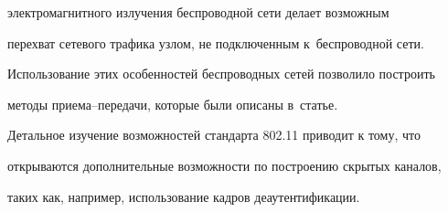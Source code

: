 электромагнитного излучения беспроводной сети делает возможным


перехват сетевого трафика узлом, не подключенным к~беспроводной сети.


Использование этих особенностей беспроводных сетей позволило построить


методы при\-е\-ма--пе\-ре\-да\-чи, которые были описаны \mbox{в~статье}.


{





}





  Детальное изучение возможностей стандарта 802.11 приводит к тому, что


открываются дополнительные возможности по построению скрытых каналов,


таких как, например, использование кадров деаутентификации.





